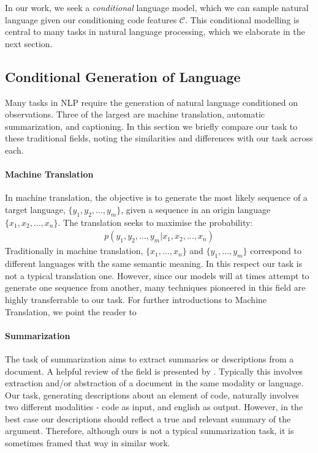 In our work, we seek a \textit{conditional} language model, which we can sample natural language given our conditioning code features $\mathcal{C}$. This conditional modelling is central to many tasks in natural language processing, which we elaborate in the next section.

\subsection{Conditional Generation of Language}

Many tasks in NLP require the generation of natural language conditioned on observations.
Three of the largest are machine translation, automatic summarization, and captioning.
In this section we briefly compare our task to these traditional fields, noting the similarities and differences with our task across each.

\paragraph{Machine Translation}
In machine translation, the objective is to generate the most likely sequence of a target language, $\{y_1, y_2,..., y_m\}$, given a sequence in an origin language  $\{x_1, x_2,..., x_n\}$. 
The translation seeks to maximise the probability:
\begin{align}
p(y_1, y_2,..., y_m| x_1, x_2,...,x_n ) \nonumber
\end{align}
Traditionally in machine translation, $\{x_1, ..., x_n\}$ and $\{y_1,..., y_m\}$ correspond to different languages with the same semantic meaning. 
In this respect our task is not a typical translation one.
However, since our models will at times attempt to generate one sequence from another, many techniques pioneered in this field are highly transferrable to our task. 
For further introductions to Machine Translation, we point the reader to \cite{trove.nla.gov.au/work/23999611,lopez_statistical_2008}

\paragraph{Summarization}
The task of summarization aims to extract summaries or descriptions from a document.
A helpful review of the field is presented by \citet{allahyari_text_2017}.
Typically this involves extraction and/or abstraction of a document in the same modality or language.
Our task, generating descriptions about an element of code, naturally involves two different modalities - code as input, and english as output.
However, in the best case our descriptions should reflect a true and relevant summary of the argument.
Therefore, although ours is not a typical summarization task, it is sometimes framed that way in similar work. \citep{iyer_summarizing_2016} 

